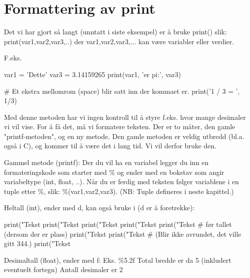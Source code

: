 \section{Formattering av print}

Det vi har gjort så langt (unntatt i siste eksempel) er å bruke print() slik: print(var1,var2,var3,..) der var1,var2,var3,... kan være variabler eller verdier.

F.eks.
\begin{usncodebox}
var1 = 'Dette'
var3 = 3.14159265
print(var1, 'er pi:', var3)

# Et ekstra mellomrom (space) blir satt inn der kommaet er. 
print('1 / 3 = ', 1/3)
\end{usncodebox}

Med denne metoden har vi ingen kontroll til å styre f.eks. hvor mange desimaler vi vil vise. For å få det, må vi formatere teksten. Der er to måter, den gamle "printf-metoden", og en ny metode. Den gamle metoden er veldig utbredd (bl.a. også i C), og kommer til å være det i lang tid. Vi vil derfor bruke den. 

Gammel metode (printf):
Der du vil ha en variabel legger du inn en formateringskode som starter 
med \% og ender med en bokstav som angir variabeltype (int, float, ..).
Når du er ferdig med teksten følger variablene i en tuple etter \%, 
slik: \%(var1,var2,var3).  (NB: Tuple defineres i neste kapittel.) 

Heltall (int), ender med d, kan også bruke i (d er å foretrekke):
\begin{usncodebox}
print("Tekst %
print("Tekst %
print("Tekst %
print("Tekst %
print("Tekst %
                                   # før tallet (dersom der er plass) 
print("Tekst %
print("Tekst %
                                   # (Blir ikke avrundet, det ville gitt 344.)  
print("Tekst %
\end{usncodebox}

Desimaltall (float), ender med f:  %
Eks. \%5.2f
  Total bredde er da 5 (inkludert eventuelt fortegn)
  Antall desimaler er 2

